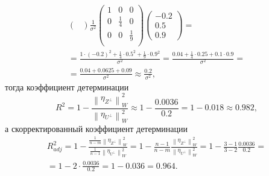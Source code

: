 \documentclass[a4paper,12pt]{article}
\newcommand{\norm}[1]{\left \| #1 \right \|}
\newcommand{\pro}[2]{#1_{#2^\perp}}
\begin{document}
\begin{enumerate}
\begin{multline*}
\begin{pmatrix}
              \end{pmatrix}
              \frac{1}{\sigma^2}
              \begin{pmatrix}
                  1 & 0           & 0           \\
                  0 & \frac{1}{4} & 0           \\
                  0 & 0           & \frac{1}{9} \\
              \end{pmatrix}
              \begin{pmatrix}
                  -0.2 \\
                  0.5  \\
                  0.9
              \end{pmatrix} = \\
              = \frac{1 \cdot (-0.2)^2 + \frac{1}{4} \cdot 0.5^2 + \frac{1}{9} \cdot 0.9^2}{\sigma^2}
              = \frac{0.04 + \frac{1}{4} \cdot 0.25 + 0.1 \cdot 0.9}{\sigma^2} = \\
              = \frac{0.04 + 0.0625 + 0.09}{\sigma^2}
              \approx \frac{0.2}{\sigma^2} ,
          \end{multline*}
          тогда коэффициент детерминации
          \[
              R^2
              = 1 - \frac{\norm{\pro{\eta}{Z}}_W^2}{\norm{\pro{\eta}{U}}_W^2}
              \approx 1 - \frac{0.0036}{0.2}
              = 1 - 0.018
              \approx 0.982 ,
          \]
          а скорректированный коэффициент детерминации
          \begin{multline*}
              R_{adj}^2
              = 1 - \frac{\frac{1}{n-m}\norm{\pro{\eta}{Z}}_W^2}{\frac{1}{n-1}\norm{\pro{\eta}{U}}_W^2}
              = 1 - \frac{n-1}{n-m} \frac{\norm{\pro{\eta}{Z}}_W^2}{\norm{\pro{\eta}{U}}_W^2}
              = 1 - \frac{3-1}{3-2} \frac{0.0036}{0.2} = \\
              = 1 - 2 \cdot \frac{0.0036}{0.2}
              = 1 - 0.036
              = 0.964 .
          \end{multline*}


\end{enumerate}
\end{document}
